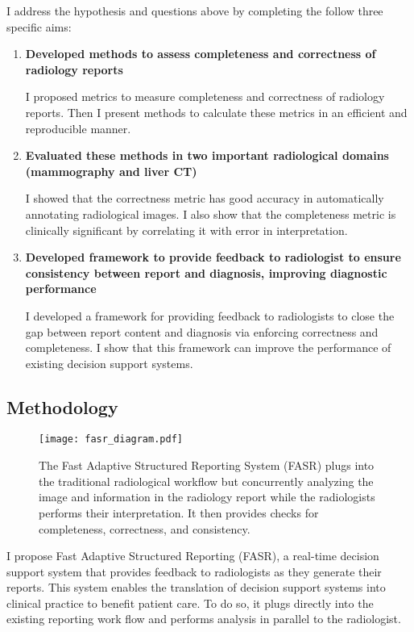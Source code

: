 I address the hypothesis and questions above by completing the follow three specific aims:

\begin{enumerate}
	\item \textbf{Developed methods to assess completeness and correctness of radiology reports}
	
	I proposed metrics to measure completeness and correctness of radiology reports. Then I present methods to calculate these metrics in an efficient and reproducible manner.
	
	\item \textbf{Evaluated these methods in two important radiological domains (mammography and liver CT)}
	
	I showed that the correctness metric has good accuracy in automatically annotating radiological images. I also show that the completeness metric is clinically significant by correlating it with error in interpretation.
	
	\item \textbf{Developed framework to provide feedback to radiologist to ensure consistency between report and diagnosis, improving diagnostic performance}
	
	I developed a framework for providing feedback to radiologists to close the gap between report content and diagnosis via enforcing correctness and completeness. I show that this framework can improve the performance of existing decision support systems.
\end{enumerate}

\subsection{Methodology}

\begin{figure}[h]
	\centering
	\texttt{[image: fasr\_diagram.pdf]}
	\caption[Overview of the Fast Adaptive Structured Reporting (FASR) system]{The Fast Adaptive Structured Reporting System (FASR) plugs into the traditional radiological workflow but concurrently analyzing the image and information in the radiology report while the radiologists performs their interpretation. It then provides checks for completeness, correctness, and consistency.}
	\label{fig:fasr_diagram}
\end{figure}

I propose Fast Adaptive Structured Reporting (FASR), a real-time decision support system that provides feedback to radiologists as they generate their reports. 
This system enables the translation of decision support systems into clinical practice to benefit patient care. 
To do so, it plugs directly into the existing reporting work flow and performs analysis in parallel to the radiologist.

